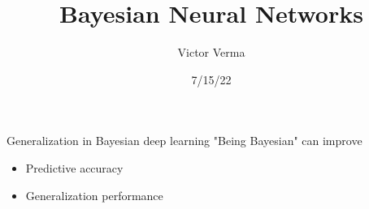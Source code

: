 \documentclass{beamer}
\title[Bayesian Neural Networks]{
Bayesian Neural Networks
}
\author[Victor Verma]{Victor Verma}
\institute[]{Hot Ideas in Machine Learning Reading Group, University of Michigan}
\date{7/15/22}
\begin{document}
\begin{frame}
  \titlepage
\end{frame}



\begin{frame}{Generalization in Bayesian deep learning}
    "Being Bayesian" can improve
    \begin{itemize}
        \item Predictive accuracy
        \item Generalization performance
    \end{itemize}
\end{frame}
\end{document}
